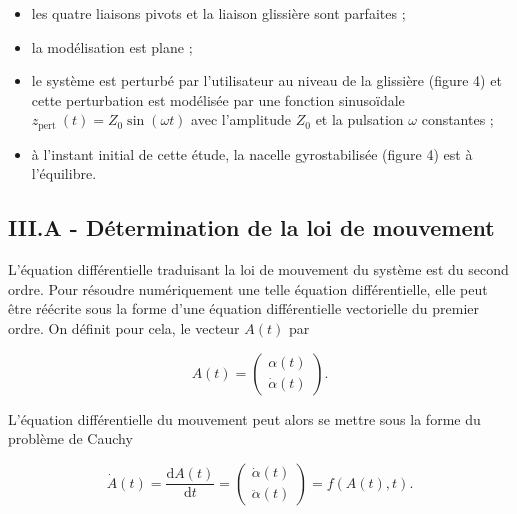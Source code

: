 \begin{itemize}
  \item les quatre liaisons pivots et la liaison glissière sont parfaites ;
  \item la modélisation est plane ;
  \item le système est perturbé par l'utilisateur au niveau de la glissière (figure 4) et cette perturbation est modélisée par une fonction sinusoïdale $z_{\text {pert }}(t)=Z_{0} \sin (\omega t)$ avec l'amplitude $Z_{0}$ et la pulsation $\omega$ constantes ;
  \item à l'instant initial de cette étude, la nacelle gyrostabilisée (figure 4) est à l'équilibre.
\end{itemize}

\subsection{III.A - Détermination de la loi de mouvement}
\ifprof
\begin{corrige}
\end{corrige}
\else
\fi

L'équation différentielle traduisant la loi de mouvement du système est du second ordre. Pour résoudre numériquement une telle équation différentielle, elle peut être réécrite sous la forme d'une équation différentielle vectorielle du premier ordre. On définit pour cela, le vecteur $A(t)$ par

$$
A(t)=\left(\begin{array}{c}
\alpha(t) \\
\dot{\alpha}(t)
\end{array}\right) .
$$

L'équation différentielle du mouvement peut alors se mettre sous la forme du problème de Cauchy

$$
\dot{A}(t)=\frac{\mathrm{d} A(t)}{\mathrm{d} t}=\left(\begin{array}{c}
\dot{\alpha}(t) \\
\ddot{\alpha}(t)
\end{array}\right)=f(A(t), t) .
$$

